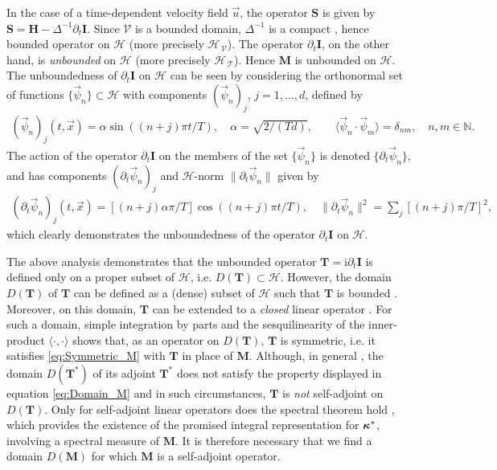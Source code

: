 \documentclass[11pt]{amsart}
\newcommand{\I}{\mathrm{i}}
\newcommand{\Mb}{\mathbf{M}}
\newcommand{\Tb}{\mathbf{T}}
\newcommand{\Hb}{\mathbf{H}}
\newcommand{\Ib}{\mathbf{I}}
\newcommand{\Sb}{\mathbf{S}}
\newcommand{\Tc}{\mathcal{T}}
\newcommand{\Vc}{\mathcal{V}}
\newcommand{\Hs}{\mathscr{H}}
\newcommand\bkappa{\mbox{\boldmath${\kappa}$}}
\begin{document}
In the case of a time-dependent velocity field $\vec{u}$, the operator
$\Sb$ is given by $\Sb=\Hb-\Delta^{-1}\partial_t\Ib$. Since $\Vc$ is a bounded
domain, $\Delta^{-1}$ is a compact \cite{Stakgold:BVP:2000},
hence bounded operator on $\Hs$ (more precisely $\Hs_{\,\Vc}$). The
operator $\partial_t\Ib$, on the other hand, is \emph{unbounded}
\cite{Reed-1980,Stone:64} on $\Hs$ 
(more precisely $\Hs_{\,\Tc}$). Hence $\Mb$ is unbounded on $\Hs$. The
unboundedness of $\partial_t\Ib$ on $\Hs$ can be seen by considering the
orthonormal set of functions $\{\vec{\psi}_n\}\subset\Hs$ with components
$(\vec{\psi}_n)_j$, $j=1,\ldots,d$, defined by
%
\begin{align}\label{eq:Orthonormal}
  (\vec{\psi}_n)_j(t,\vec{x})=\alpha\sin((n+j)\pi t/T), \quad
  \alpha=\sqrt{2/(Td)},
  \qquad
  \langle\vec{\psi}_n\cdot\vec{\psi}_m\rangle=\delta_{nm}, \quad
  n,m\in\mathbb{N}.
\end{align}
%
The action of the operator $\partial_t\Ib$ on the members of the set
$\{\vec{\psi}_n\}$ is denoted $\{\partial_t\vec{\psi}_n\}$, and has components
$(\partial_t\vec{\psi}_n)_j$ and $\Hs$-norm $\|\partial_t\vec{\psi}_n\|$ given by
%
\begin{align}\label{eq:Orthonormal_Diff}
  (\partial_t\vec{\psi}_n)_j(t,\vec{x})=[(n+j)\alpha\pi/T]\cos((n+j)\pi t/T),\quad
  \|\partial_t\vec{\psi}_n\|^2%
               =\sum_j[(n+j)\pi/T]^2,
\end{align}
%
which clearly demonstrates the unboundedness of the operator $\partial_t\Ib$
on $\Hs$.




The above analysis demonstrates that the unbounded operator
$\Tb=\I\partial_t\Ib$ is defined only on a proper subset of $\Hs$,
i.e. $D(\Tb)\subset\Hs$. However, the domain $D(\Tb)$ of $\Tb$ can be
defined as a (dense) subset of $\Hs$ such that $\Tb$ is bounded
\cite{Reed-1980,Stone:64}. Moreover, on this domain, $\Tb$ can be
extended to a \emph{closed} linear operator \cite{Reed-1980,Stone:64}.
For such a domain, simple integration by parts and the sesquilinearity 
of the inner-product $\langle\cdot,\cdot\rangle$ shows that, as an operator on $D(\Tb)$,
$\Tb$ is symmetric, i.e. it satisfies \eqref{eq:Symmetric_M} with
$\Tb$ in place of $\Mb$. Although, in general \cite{Reed-1980}, the
domain $D(\Tb^*)$ of its adjoint $\Tb^*$ does not satisfy the property
displayed in equation \eqref{eq:Domain_M} and in such circumstances,
$\Tb$ is \emph{not} self-adjoint on $D(\Tb)$. Only for self-adjoint
linear operators does the spectral theorem hold \cite{Reed-1980},
which provides the existence of the promised integral representation
for $\bkappa^*$, involving a spectral measure of $\Mb$. It is therefore
necessary that we find a domain $D(\Mb)$ for which $\Mb$ is a
self-adjoint operator.   
\end{document}
